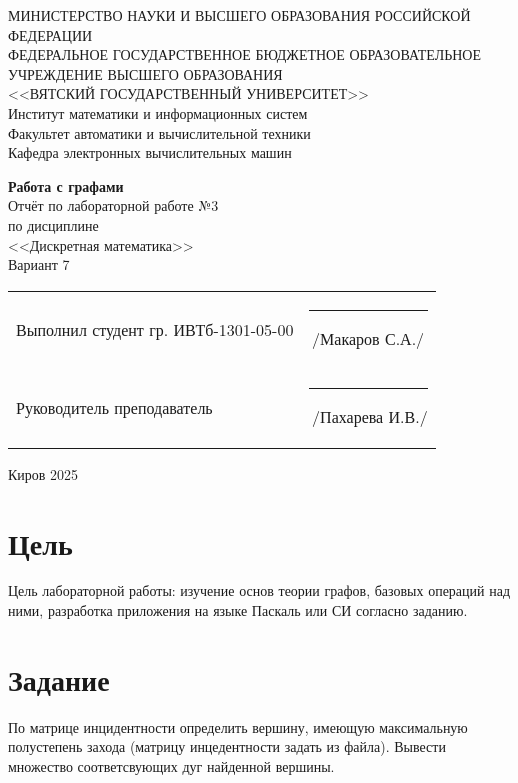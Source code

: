 \documentclass[a4paper,14pt]{extarticle}
\begin{document}
  \newpage\thispagestyle{empty}
  \begin{center}
    \MakeUppercase{
      Министерство науки и высшего образования Российской Федерации\\
      Федеральное государственное бюджетное образовательное учреждение высшего образования\\
      <<Вятский Государственный Университет>>\\
    }
    Институт математики и информационных систем\\
    Факультет автоматики и вычислительной техники\\
    Кафедра электронных вычислительных машин
  \end{center}
  \vfill

  \begin{center}
    \textbf{Работа с графами}\\
    Отчёт по лабораторной работе №3\\
    по дисциплине\\
    <<Дискретная математика>>\\
    Вариант 7
  \end{center}
  \vfill

  \noindent
  \begin{tabular}{ll}
    Выполнил студент гр. ИВТб-1301-05-00 \hspace{5mm} &
    \rule[-1mm]{25mm}{0.10mm}\,/Макаров С.А./\\
    
    Руководитель преподаватель & \rule[-1mm]{25mm}{0.10mm}\,/Пахарева И.В./\\
  \end{tabular}

  \vfill
  \begin{center}
    Киров 2025
  \end{center}

  \newpage
  \section*{Цель}
  Цель лабораторной работы: изучение основ теории графов, базовых операций над ними, разработка приложения на языке Паскаль или СИ согласно заданию.

  \section*{Задание}
  По матрице инцидентности определить вершину, имеющую максимальную полустепень захода (матрицу инцедентности задать из файла). Вывести множество соответсвующих дуг найденной вершины.
\end{document}
